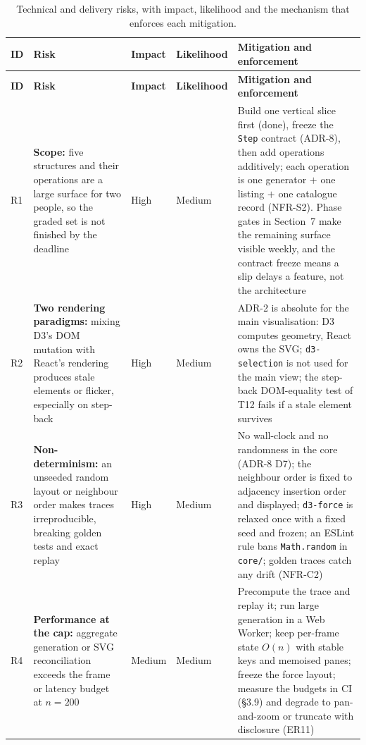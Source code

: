 \documentclass[11pt,a4paper]{article}
\newcommand{\ct}[1]{\texttt{#1}}
\begin{document}
{\footnotesize
\setlength{\tabcolsep}{4pt}
\begin{longtable}{@{}L{0.8cm}L{3.5cm}L{1.3cm}L{1.3cm}L{6.6cm}@{}}
\caption{Technical and delivery risks, with impact, likelihood and the mechanism that enforces
each mitigation.}\label{tab:risks}\\
\toprule
\textbf{ID} & \textbf{Risk} & \textbf{Impact} & \textbf{Likelihood} & \textbf{Mitigation and enforcement} \\
\midrule
\endfirsthead
\toprule
\textbf{ID} & \textbf{Risk} & \textbf{Impact} & \textbf{Likelihood} & \textbf{Mitigation and enforcement} \\
\midrule
\endhead
\bottomrule
\endlastfoot
R1 & \textbf{Scope:} five structures and their operations are a large surface for two people,
so the graded set is not finished by the deadline & High & Medium & Build one vertical slice
first (done), freeze the \ct{Step} contract (ADR-8), then add operations additively; each
operation is one generator \(+\)
one listing \(+\)
one catalogue record (NFR-S2). Phase gates in Section~7 make the remaining surface visible
weekly, and the contract freeze means a slip delays a feature, not the architecture \\
R2 & \textbf{Two rendering paradigms:} mixing D3's DOM mutation with React's rendering
produces stale elements or flicker, especially on step-back & High & Medium & ADR-2 is
absolute for the main visualisation: D3 computes geometry, React owns the SVG; \ct{d3-selection}
is not used for the main view; the step-back DOM-equality test of T12 fails if a stale element
survives \\
R3 & \textbf{Non-determinism:} an unseeded random layout or neighbour order makes traces
irreproducible, breaking golden tests and exact replay & High & Medium & No wall-clock and no
randomness in the core (ADR-8 D7); the neighbour order is fixed to adjacency insertion order
and displayed; \ct{d3-force} is relaxed once with a fixed seed and frozen; an ESLint rule bans
\ct{Math.random} in \ct{core/}; golden traces catch any drift (NFR-C2) \\
R4 & \textbf{Performance at the cap:} aggregate generation or SVG reconciliation exceeds the
frame or latency budget at $n = 200$ & Medium & Medium & Precompute the trace and replay it;
run large generation in a Web Worker; keep per-frame state $O(n)$ with stable keys and
memoised panes; freeze the force layout; measure the budgets in CI (\S3.9) and degrade to
pan-and-zoom or truncate with disclosure (ER11) \\

\end{longtable}}
\end{document}
